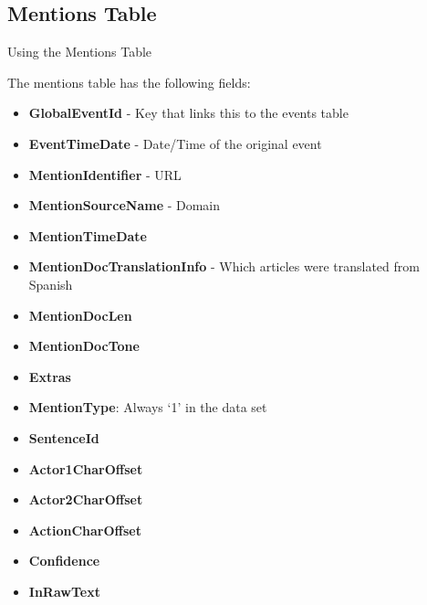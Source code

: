 \subsection{Mentions Table}
Using the Mentions Table %
\par The mentions table has the following fields:
\begin{itemize} \item \textbf{GlobalEventId} - Key that links this to the events table
\item \textbf{EventTimeDate} - Date/Time of the original event
\item \textbf{MentionIdentifier} - URL
\item \textbf{MentionSourceName} - Domain
\item \textbf{MentionTimeDate}  
\item \textbf{MentionDocTranslationInfo} - Which articles were translated from Spanish %
\item \textbf{MentionDocLen}
\item \textbf{MentionDocTone}
\item \textbf{Extras}
\item \textbf{MentionType}: Always ‘1’ in the data set
\item \textbf{SentenceId}
\item \textbf{Actor1CharOffset}
\item \textbf{Actor2CharOffset}
\item \textbf{ActionCharOffset}
\item \textbf{Confidence}
\item \textbf{InRawText} \end{itemize}

